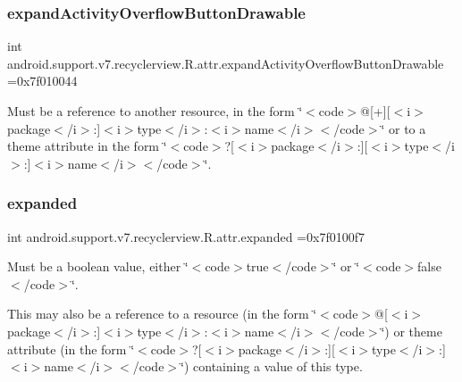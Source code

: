 \subsubsection{\texorpdfstring{expand\+Activity\+Overflow\+Button\+Drawable}{expandActivityOverflowButtonDrawable}}
{\footnotesize\ttfamily int android.\+support.\+v7.\+recyclerview.\+R.\+attr.\+expand\+Activity\+Overflow\+Button\+Drawable =0x7f010044\hspace{0.3cm}{\ttfamily [static]}}

Must be a reference to another resource, in the form \char`\"{}$<$code$>$@\mbox{[}+\mbox{]}\mbox{[}$<$i$>$package$<$/i$>$\+:\mbox{]}$<$i$>$type$<$/i$>$\+:$<$i$>$name$<$/i$>$$<$/code$>$\char`\"{} or to a theme attribute in the form \char`\"{}$<$code$>$?\mbox{[}$<$i$>$package$<$/i$>$\+:\mbox{]}\mbox{[}$<$i$>$type$<$/i$>$\+:\mbox{]}$<$i$>$name$<$/i$>$$<$/code$>$\char`\"{}. \mbox{\label{classandroid_1_1support_1_1v7_1_1recyclerview_1_1R_1_1attr_af3a8b0935266312d3a1f395a62bb97d2}} 
\subsubsection{\texorpdfstring{expanded}{expanded}}
{\footnotesize\ttfamily int android.\+support.\+v7.\+recyclerview.\+R.\+attr.\+expanded =0x7f0100f7\hspace{0.3cm}{\ttfamily [static]}}

Must be a boolean value, either \char`\"{}$<$code$>$true$<$/code$>$\char`\"{} or \char`\"{}$<$code$>$false$<$/code$>$\char`\"{}. 

This may also be a reference to a resource (in the form \char`\"{}$<$code$>$@\mbox{[}$<$i$>$package$<$/i$>$\+:\mbox{]}$<$i$>$type$<$/i$>$\+:$<$i$>$name$<$/i$>$$<$/code$>$\char`\"{}) or theme attribute (in the form \char`\"{}$<$code$>$?\mbox{[}$<$i$>$package$<$/i$>$\+:\mbox{]}\mbox{[}$<$i$>$type$<$/i$>$\+:\mbox{]}$<$i$>$name$<$/i$>$$<$/code$>$\char`\"{}) containing a value of this type. \mbox{\label{classandroid_1_1support_1_1v7_1_1recyclerview_1_1R_1_1attr_a2bfaddfa25b0ae1fa133581b7b158899}} 
